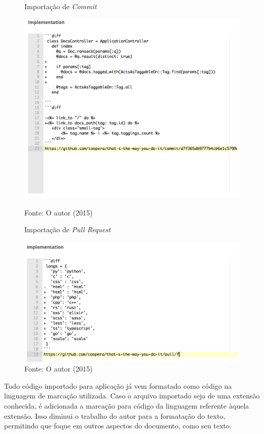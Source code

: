 \begin{figure}[h]
	\centering
    \caption{Importação de \textit{Commit}}
    \includegraphics[width=15cm]{Imagens/import-commit.png}
		\label{fig:doc-import-4}
	\caption*{Fonte: O autor (2015)}
\end{figure}

\begin{figure}[h]
	\centering
    \caption{Importação de \textit{Pull Request}}
    \includegraphics[width=15cm]{Imagens/import-pr.png}
	\caption*{Fonte: O autor (2015)}
\end{figure}

Todo código importado para aplicação já vem formatado como código na linguagem de marcação utilizada. Caso o arquivo importado seja de uma extensão conhecida, é adicionada a marcação para código da linguagem referente àquela extensão. Isso diminui o trabalho do autor para a formatação do texto, permitindo que foque em outros aspectos do documento, como seu texto.


